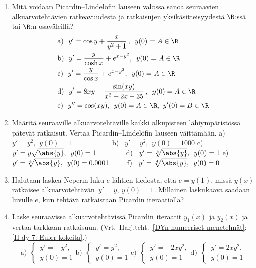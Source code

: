 \Harj
\begin{enumerate}

\item
Mitä voidaan Picardin--Lindelöfin lauseen valossa sanoa seuraavien alkuarvotehtävien 
ratkeavuudesta ja ratkaisujen yksikäsitteisyydestä $\R$:ssä tai $\R$:n osaväleillä?
\begin{align*}
&\text{a)}\ \ y'=\cos y+\frac{x}{y^2+1}\,,\,\ y(0)=A\in\R \\
&\text{b)}\ \ y'=\frac{y}{\cosh x}+e^{x-y^2},\,\ y(0)=A\in\R \\ 
&\text{c)}\ \ y'=\frac{y}{\cos x}+e^{x-y^2},\,\ y(0)=A\in\R \\
&\text{d)}\ \ y'=8xy+\frac{\sin(xy)}{x^2+2x-35}\,,\,\ y(0)=A\in\R \\
&\text{e)}\ \ y''=\cos(xy),\,\ y(0)=A\in\R,\ y'(0)=B\in\R
\end{align*}

\item
Määritä seuraaville alkuarvotehtäville kaikki alkupisteen lähiympäristössä pätevät ratkaisut.
Vertaa Picardin--Lindelöfin lauseen väittämään. \vspace{1mm}\newline
a) \ $y'=y^2,\,\ y(0)=1 \qquad\qquad\quad\,\ $
b) \ $y'=y^2,\,\ y(0)=1000$ \newline
c) \ $y'=y\sqrt{\abs{y}},\,\ y(0)=1 \qquad\quad\,\ \ $
d) \ $y'=\sqrt[4]{\abs{y}},\,\ y(0)=1$ \newline 
e) \ $y'=\sqrt[4]{\abs{y}},\,\ y(0)=0.0001 \qquad\,$
f) \ $y'=\sqrt[4]{\abs{y}},\,\ y(0)=0$

\item 
Halutaan laskea Neperin luku $e$ lähtien tiedosta, että $e=y(1)$, missä $y(x)$ ratkaisee
alkuarvotehtävän $\,y'=y,\ y(0)=1$. Millainen laskukaava saadaan luvulle $e$, kun tehtävä 
ratkaistaan Picardin iteraatiolla?

\item 
Laske seuraavissa alkuarvotehtävissä Picardin iteraatit $y_1(x)$ ja $y_2(x)$ ja vertaa 
tarkkaan ratkaisuun. 
(Vrt.\ Harj.teht.\ \ref{DYn numeeriset menetelmät}:\ref{H-dy-7: Euler-kokeita}.)
\[
\text{a)}\ \ \begin{cases} \,y'=-y^2, \\ \,y(0)=1 \end{cases}
\text{b)}\ \ \begin{cases} \,y'=y^2, \\ \,y(0)=1 \end{cases}
\text{c)}\ \ \begin{cases} \,y'=-2xy^2, \\ \,y(0)=1 \end{cases}
\text{d)}\ \ \begin{cases} \,y'=2xy^2, \\ \,y(0)=1 \end{cases}
\]


\end{enumerate}
